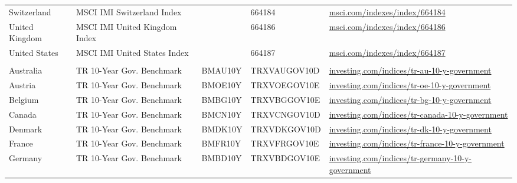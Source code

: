 {\begin{longtable}{l l l l l}
\hspace{1em}Switzerland & MSCI IMI Switzerland Index &  & 664184 & \href{https://www.msci.com/indexes/index/664184}{msci.com/indexes/index/664184} \\
\hspace{1em}United Kingdom & MSCI IMI United Kingdom Index &  & 664186 & \href{https://www.msci.com/indexes/index/664186}{msci.com/indexes/index/664186} \\
\hspace{1em}United States & MSCI IMI United States Index &  & 664187 & \href{https://www.msci.com/indexes/index/664187}{msci.com/indexes/index/664187} \\
\pagebreak
\multicolumn{5}{l}{\textit{Bonds (18 series)}} \\
\hspace{1em}Australia & TR 10-Year Gov. Benchmark & BMAU10Y & TRXVAUGOV10D & \href{https://www.investing.com/indices/tr-au-10-y-government}{investing.com/indices/tr-au-10-y-government} \\
\hspace{1em}Austria & TR 10-Year Gov. Benchmark & BMOE10Y & TRXVOEGOV10E & \href{https://www.investing.com/indices/tr-oe-10-y-government}{investing.com/indices/tr-oe-10-y-government} \\
\hspace{1em}Belgium & TR 10-Year Gov. Benchmark & BMBG10Y & TRXVBGGOV10E & \href{https://www.investing.com/indices/tr-bg-10-y-government}{investing.com/indices/tr-bg-10-y-government} \\
\hspace{1em}Canada & TR 10-Year Gov. Benchmark & BMCN10Y & TRXVCNGOV10D & \href{https://www.investing.com/indices/tr-canada-10-y-government}{investing.com/indices/tr-canada-10-y-government} \\
\hspace{1em}Denmark & TR 10-Year Gov. Benchmark & BMDK10Y & TRXVDKGOV10D & \href{https://www.investing.com/indices/tr-dk-10-y-government}{investing.com/indices/tr-dk-10-y-government} \\
\hspace{1em}France & TR 10-Year Gov. Benchmark & BMFR10Y & TRXVFRGOV10E & \href{https://www.investing.com/indices/tr-france-10-y-government}{investing.com/indices/tr-france-10-y-government} \\
\hspace{1em}Germany & TR 10-Year Gov. Benchmark & BMBD10Y & TRXVBDGOV10E & \href{https://www.investing.com/indices/tr-germany-10-y-government}{investing.com/indices/tr-germany-10-y-government} \\

\end{longtable}}
